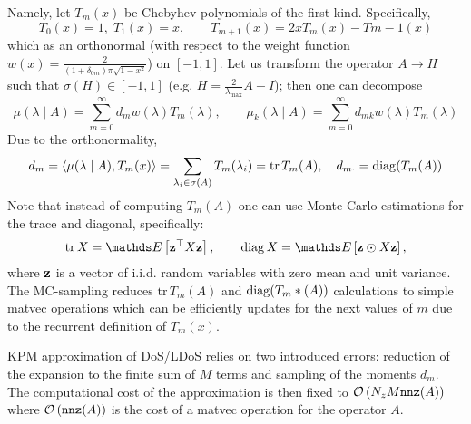 Namely, let \( T_m(x)\) be Chebyhev polynomials of the first kind. Specifically,
\begin{equation}
      T_0(x) = 1, \; T_1(x) = x, \qquad T_{m+1}(x) = 2x T_m(x) - T{m-1} (x)
\end{equation}
which as an orthonormal (with respect to the weight function \(w(x) = \frac{2}{(1+\delta_{0m}) \pi \sqrt{1-x^2}}\)) on \( [-1, 1 ]\). Let us transform the operator \( A \to H  \) such that \( \sigma(H) \in [-1, 1]\) (e.g. \( H = \frac{2}{\lambda_{\max{}}} A - I\)); then one can decompose 
\begin{equation}
      \mu( \lambda \mid A ) = \sum_{m=0}^\infty d_m w(\lambda)T_m(\lambda), \qquad       \mu_k( \lambda \mid A ) = \sum_{m=0}^\infty d_{mk} w(\lambda)T_m(\lambda) 
\end{equation}
Due to the orthonormality, 
\begin{equation}
      d_m = \left\langle \mu(\lambda \mid A ), T_m(x) \right\rangle = \sum_{\lambda_i \in \sigma(A)} T_m(\lambda_i) = \mathrm{tr} \, T_m(A), \quad d_{m\cdot} = \operatorname{diag}( T_m(A) )
\end{equation}
Note that instead of computing \( T_m(A) \) one can use Monte-Carlo estimations for the trace and diagonal, specifically:
\begin{equation}
      \mathrm{tr}\, X = \ds E \left[ \b z^\top X \b z \right], \qquad \mathrm{diag}\, X = \ds E \left[ \b z \odot X \b z \right], 
\end{equation}
where \( \mathbf{z} \) is a vector of i.i.d. random variables with zero mean and unit variance. The MC-sampling reduces \( \mathrm{tr}\, T_m(A) \) and \( \operatorname{diag} ( T_m*(A))\) calculations to simple matvec operations which can be efficiently updates for the next values of \( m \) due to the recurrent definition of \( T_m(x)\). 

KPM approximation of DoS/LDoS relies on two introduced errors: reduction of  the expansion to the finite sum of \( M \) terms and sampling of the moments \( d_m \). The computational cost of the approximation is then fixed to \( \mathcal{O} \left(  N_z M \texttt{nnz} (A) \right)\) where \( \mathcal{O} \left( \texttt{nnz} (A) \right)\) is the cost of a matvec operation for the operator \( A \).






